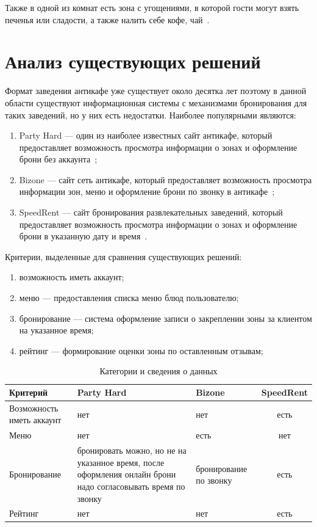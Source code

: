 Также в одной из комнат есть зона с угощениями, в которой гости могут взять печенья или сладости, а также налить себе кофе, чай~\cite{anticafe-login}.

\section{Анализ существующих решений}

Формат заведения антикафе уже существует около десятка лет поэтому в данной области существуют информационная системы с механизмами бронирования для таких заведений, но у них есть недостатки. Наиболее популярными являются:
\begin{enumerate}
	\item Party Hard --- один из наиболее известных сайт антикафе, который предоставляет возможность просмотра информации о зонах и оформление брони без аккаунта~\cite{party-hard}; 
	\item Bizone --- сайт сеть антикафе, который предоставляет возможность просмотра информации зон, меню и оформление брони по звонку в антикафе~\cite{bizone};
	\item SpeedRent --- сайт бронирования развлекательных заведений, который предоставляет возможность просмотра информации о зонах и оформление брони в указанную дату и время~\cite{speedren}.
\end{enumerate}

Критерии, выделенные для сравнения существующих решений:
\begin{enumerate}
	\item возможность иметь аккаунт;
	\item меню --- предоставления списка меню блюд пользователю;
	\item бронирование --- система оформление записи о закреплении зоны за клиентом на указанное время;
	\item рейтинг --- формирование оценки зоны по оставленным отзывам;
\end{enumerate}

\begin{table}[ht]
	\begin{center}
		\begin{threeparttable}
			\caption{\label{tb:d} Категории и сведения о данных}
			\begin{tabular}{|p{4cm}|p{4cm}|p{4cm}|c|}
				\hline
				\textbf{Критерий} & \textbf{Party Hard} & \textbf{Bizone} & \textbf{SpeedRent} \\ \hline
				Возможность иметь аккаунт & нет & нет & есть\\ \hline
				Меню & нет & есть & нет \\ \hline
				Бронирование  & бронировать можно, но не на указанное время, после оформления онлайн брони надо согласовывать время по звонку & бронирование по звонку & есть \\ \hline
				Рейтинг & нет & нет & есть \\ \hline
			\end{tabular}
		\end{threeparttable}
	\end{center}
\end{table}

